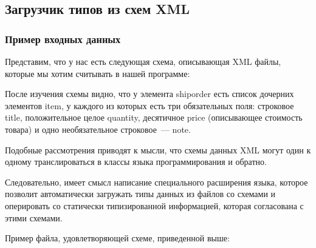 \subsection{Загрузчик типов из схем XML}\label{xml-loader}

\subsubsection{Пример входных данных}

Представим, что у нас есть следующая схема, описывающая XML файлы, которые мы хотим считывать в нашей программе:


После изучения схемы видно, что у элемента shiporder есть список дочерних элементов item, у каждого из которых есть три обязательных поля: строковое title, положительное целое quantity, десятичное price (описывающее стоимость товара) и одно необязательное строковое~--- note.

Подобные рассмотрения приводят к мысли, что схемы данных XML могут один к одному транслироваться в классы языка программирования и обратно.

Следовательно, имеет смысл написание специального расширения языка, которое позволит автоматически загружать типы данных из файлов со схемами и оперировать со статически типизированной информацией, которая согласована с этими схемами.

Пример файла, удовлетворяющей схеме, приведенной выше:


